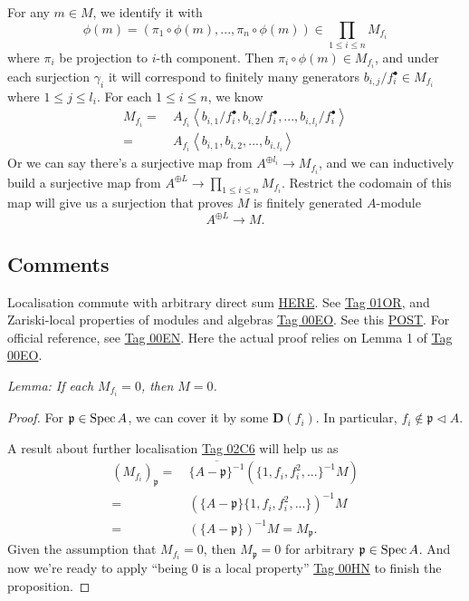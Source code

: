 For any $m\in M$, we identify it with \[\phi(m)=(\pi_1\circ \phi(m),...,\pi_n\circ\phi(m))\in\prod_{1\leq i\leq n}M_{f_i}\] where $\pi_i$ be projection to $i$-th component. Then $\pi_i\circ \phi(m)\in M_{f_i}$, and under each surjection $\gamma_i$ it will correspond to finitely many generators $b_{i,j}/f^{\bullet}_{i}\in M_{f_i}$ where $1\leq j\leq l_i$. For each $1\leq i\leq n$, we know 
\begin{align*}
	M_{f_i}=&~ A_{f_i} \left\langle b_{i,1}/f^{\bullet}_{i}, b_{i,2}/f^{\bullet}_{i}, ..., b_{i,l_i}/f^{\bullet}_{i}\right\rangle\\
	=&~ A_{f_i} \left\langle b_{i,1}, b_{i,2}, ..., b_{i,l_i}\right\rangle
\end{align*}
Or we can say there's a surjective map from $A^{\oplus l_i}\to M_{f_i}$, and we can inductively build a surjective map from $A^{\oplus L}\to \prod_{1\leq i\leq n}M_{f_i}$. Restrict the codomain of this map will give us a surjection that proves $M$ is finitely generated $A$-module
\[A^{\oplus L}\to M.\]


\subsection{Comments}

Localisation commute with arbitrary direct sum \href{https://math.stackexchange.com/questions/3386775/localization-commutes-with-arbitrary-direct-sums}{HERE}. 
See \href{https://stacks.math.columbia.edu/tag/01OR}{Tag 01OR}, and Zariski-local properties of modules and algebras \href{https://stacks.math.columbia.edu/tag/00EO}{Tag 00EO}.
See this \href{https://mathoverflow.net/questions/52014/is-being-finitely-generated-a-local-property}{POST}.
For official reference, see \href{https://stacks.math.columbia.edu/tag/00EN}{Tag 00EN}. Here the actual proof relies on Lemma 1 of \href{https://stacks.math.columbia.edu/tag/00EO}{Tag 00EO}.


\textit{Lemma: If each $M_{f_i}=0$, then $M=0$.}
\begin{proof}
	For $\mathfrak p\in \operatorname{Spec} A$, we can cover it by some $\mathbf D(f_i)$. In particular, $f_i\notin \mathfrak p\triangleleft A$.

	A result about further localisation \href{https://stacks.math.columbia.edu/tag/02C6}{Tag 02C6} will help us as
	\begin{align*}
		(M_{f_i})_{\mathfrak p} =&~ \overline{\{A-\mathfrak p\}^{-1}}(\{1,f_i,f_i^2,...\}^{-1}M)\\
		=&~ (\{A-\mathfrak p\}\{1,f_i,f_i^2,...\})^{-1}M\\
		=&~ (\{A-\mathfrak p\})^{-1}M=M_{\mathfrak p}.
	\end{align*}
	Given the assumption that $M_{f_i}=0$, then $M_{\mathfrak p}=0$ for arbitrary $\mathfrak p\in\operatorname{Spec} A$. And now we're ready to apply \enquote{being 0 is a local property} \href{https://stacks.math.columbia.edu/tag/00HN}{Tag 00HN} to finish the proposition. 

\end{proof}



